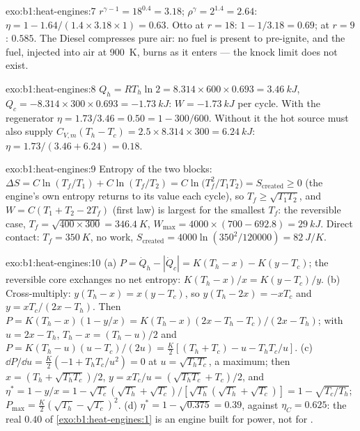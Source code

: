 \begin{solution}{exo:b1:heat-engines:7}
$r^{\gamma-1} = 18^{0.4} = 3.18$; $\rho^\gamma = 2^{1.4} = 2.64$: $\eta = 1 -
1.64/(1.4 \times 3.18 \times 1) = 0.63$. Otto at $r = 18$: $1 - 1/3.18 = 0.69$;
at $r = 9$: $0.585$. The Diesel compresses pure air: no fuel is present to
pre-ignite, and the fuel, injected into air at \qty{900}{K}, burns as it
enters --- the knock limit does not exist.
\end{solution}

\begin{solution}{exo:b1:heat-engines:8}
$Q_h = RT_h\ln2 = 8.314 \times 600 \times 0.693 = \qty{3.46}{kJ}$, $Q_c = -8.314
\times 300 \times 0.693 = \qty{-1.73}{kJ}$: $W = \qty{-1.73}{kJ}$ per cycle. With
the regenerator $\eta = 1.73/3.46 = 0.50 = 1 - 300/600$. Without it the hot
source must also supply $C_{V,m}(T_h - T_c) = 2.5 \times 8.314 \times 300 =
\qty{6.24}{kJ}$: $\eta = 1.73/(3.46 + 6.24) = 0.18$.
\end{solution}

\begin{solution}{exo:b1:heat-engines:9}
Entropy of the two blocks: $\Delta S = C\ln(T_f/T_1) + C\ln(T_f/T_2) =
C\ln\bigl(T_f^2/T_1T_2\bigr) = S_{\mathrm{created}} \geq 0$ (the engine's own
entropy returns to its value each cycle), so $T_f \geq \sqrt{T_1T_2}$, and
$W = C(T_1 + T_2 - 2T_f)$ (first law) is largest for the smallest $T_f$:
the reversible case, $T_f = \sqrt{400 \times 300} = \qty{346.4}{K}$,
$W_{\max} = 4000 \times (700 - 692.8) = \qty{29}{kJ}$. Direct contact: $T_f =
\qty{350}{K}$, no work, $S_{\mathrm{created}} = 4000\ln(350^2/120000) =
\qty{82}{J/K}$.
\end{solution}

\begin{solution}{exo:b1:heat-engines:10}
(a) $P = \dot Q_h - |\dot Q_c| = K(T_h - x) - K(y - T_c)$; the reversible core
exchanges no net entropy: $K(T_h - x)/x = K(y - T_c)/y$. (b) Cross-multiply:
$y(T_h - x) = x(y - T_c)$, so $y(T_h - 2x) = -xT_c$ and $y = xT_c/(2x - T_h)$.
Then $P = K(T_h - x)(1 - y/x) = K(T_h - x)(2x - T_h - T_c)/(2x - T_h)$; with
$u = 2x - T_h$, $T_h - x = (T_h - u)/2$ and $P = K(T_h - u)(u - T_c)/(2u) =
\tfrac{K}{2}[(T_h + T_c) - u - T_hT_c/u]$. (c) $\dd P/\dd u = \tfrac K2(-1 +
T_hT_c/u^2) = 0$ at $u = \sqrt{T_hT_c}$, a maximum; then $x = (T_h +
\sqrt{T_hT_c})/2$, $y = xT_c/u = (\sqrt{T_hT_c} + T_c)/2$, and $\eta^\ast = 1 - y/x
= 1 - \sqrt{T_c}(\sqrt{T_h} + \sqrt{T_c})/[\sqrt{T_h}(\sqrt{T_h} + \sqrt{T_c})] = 1 -
\sqrt{T_c/T_h}$; $P_{\max} = \tfrac K2(\sqrt{T_h} - \sqrt{T_c})^2$. (d)
$\eta^\ast = 1 - \sqrt{0.375} = 0.39$, against $\eta_C = 0.625$: the real $0.40$
of \cref{exo:b1:heat-engines:1} is an engine built for power, not for
.
\end{solution}

